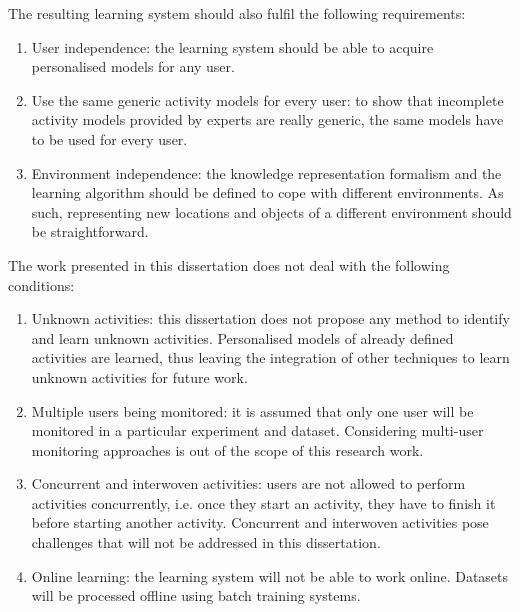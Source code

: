 The resulting learning system should also fulfil the following requirements:

\begin{enumerate}
 \item User independence: the learning system should be able to acquire personalised models for any user.
 \item Use the same generic activity models for every user: to show that incomplete activity models provided by experts are really generic, the same models have to be used for every user.
 \item Environment independence: the knowledge representation formalism and the learning algorithm should be defined to cope with different environments. As such, representing new locations and objects of a different environment should be straightforward.
\end{enumerate}


The work presented in this dissertation does not deal with the following conditions:

\begin{enumerate}
 \item Unknown activities: this dissertation does not propose any method to identify and learn unknown activities. Personalised models of already defined activities are learned, thus leaving the integration of other techniques to learn unknown activities for future work.
 \item Multiple users being monitored: it is assumed that only one user will be monitored in a particular experiment and dataset. Considering multi-user monitoring approaches is out of the scope of this research work.
 \item Concurrent and interwoven activities: users are not allowed to perform activities concurrently, i.e. once they start an activity, they have to finish it before starting another activity. Concurrent and interwoven activities pose challenges that will not be addressed in this dissertation.
 \item Online learning: the learning system will not be able to work online. Datasets will be processed offline using batch training systems.
\end{enumerate}



